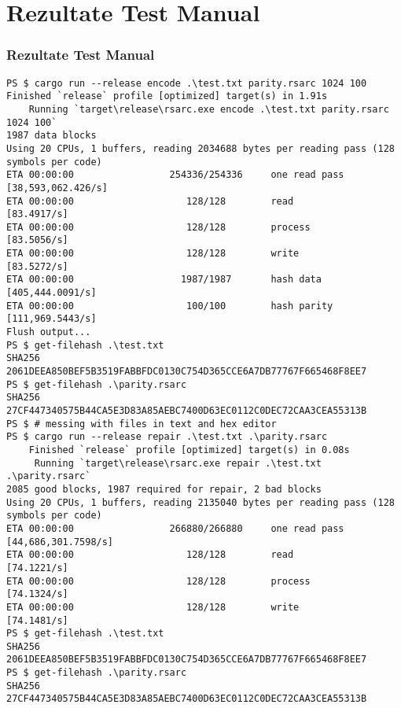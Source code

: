 \documentclass{beamer}
\begin{document}
\section{Rezultate Test Manual}
\begin{frame}[fragile]
\frametitle{Rezultate Test Manual}
\begin{tiny}
\begin{verbatim}
PS $ cargo run --release encode .\test.txt parity.rsarc 1024 100
Finished `release` profile [optimized] target(s) in 1.91s
    Running `target\release\rsarc.exe encode .\test.txt parity.rsarc 1024 100`
1987 data blocks
Using 20 CPUs, 1 buffers, reading 2034688 bytes per reading pass (128 symbols per code)
ETA 00:00:00                 254336/254336     one read pass [38,593,062.426/s]
ETA 00:00:00                    128/128        read          [83.4917/s]
ETA 00:00:00                    128/128        process       [83.5056/s]
ETA 00:00:00                    128/128        write         [83.5272/s]                                                                                                                
ETA 00:00:00                   1987/1987       hash data     [405,444.0091/s]
ETA 00:00:00                    100/100        hash parity   [111,969.5443/s]                                                                                                           
Flush output...
PS $ get-filehash .\test.txt
SHA256          2061DEEA850BEF5B3519FABBFDC0130C754D365CCE6A7DB77767F665468F8EE7
PS $ get-filehash .\parity.rsarc
SHA256          27CF447340575B44CA5E3D83A85AEBC7400D63EC0112C0DEC72CAA3CEA55313B
PS $ # messing with files in text and hex editor
PS $ cargo run --release repair .\test.txt .\parity.rsarc
    Finished `release` profile [optimized] target(s) in 0.08s
     Running `target\release\rsarc.exe repair .\test.txt .\parity.rsarc`
2085 good blocks, 1987 required for repair, 2 bad blocks
Using 20 CPUs, 1 buffers, reading 2135040 bytes per reading pass (128 symbols per code)
ETA 00:00:00                 266880/266880     one read pass [44,686,301.7598/s]
ETA 00:00:00                    128/128        read          [74.1221/s]
ETA 00:00:00                    128/128        process       [74.1324/s]
ETA 00:00:00                    128/128        write         [74.1481/s]                                                                                                                
PS $ get-filehash .\test.txt    
SHA256          2061DEEA850BEF5B3519FABBFDC0130C754D365CCE6A7DB77767F665468F8EE7
PS $ get-filehash .\parity.rsarc
SHA256          27CF447340575B44CA5E3D83A85AEBC7400D63EC0112C0DEC72CAA3CEA55313B
\end{verbatim}
\end{tiny}
\end{frame}
\end{document}
